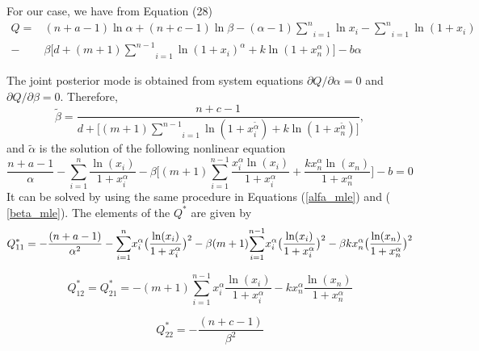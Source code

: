 \documentclass[a4paper, 11pt]{article}
\numberwithin{equation}{section}
\begin{document}
For our case, we have from Equation (28) %
\begin{equation}
\begin{aligned}
Q=&(n+a-1)\ln \alpha +(n+c-1)\ln \beta -(\alpha-1)\underset{i=1}{\overset{n}{\sum }}\ln x_{i}- \underset{i=1}{\overset{n}{\sum }}\ln (1+x_{i}) \\
-&\beta \big[ d+(m+1)\underset{i=1}{\overset{n-1}{\sum }}\ln (1+x_{i})^{\alpha} +k \ln(1+x_{n}^{\alpha}) \big]-b \alpha 
\end{aligned}
\end{equation}%

The joint posterior mode is obtained from system equations $\partial Q/\partial
\alpha =0$ and $\partial Q/\partial \beta =0$. Therefore, 
\begin{equation}
\widetilde{\beta }=\frac{n+c-1}{d+\big [(m+1)\underset{i=1}{\overset{n-1}{\sum }}\ln (1+x_{i}^{\widetilde{\alpha }}) +k \ln(1+x_n^{\widetilde{\alpha }}) \big]},
\end{equation}%
and $\widetilde{\alpha }$ is the solution of the following nonlinear equation%
\begin{equation}
\frac{n+a-1}{\alpha }-\underset{i=1}{\overset{n}{\sum }}\frac{\ln(x_i)}{1+x_i^\alpha}-\beta \big[ (m+1) \underset{i=1}{\overset{n-1}{\sum }} \frac{x_i^\alpha \ln(x_i)}{1+x_i^\alpha} 
+\frac{k x_n^\alpha \ln(x_n)}{1+x_n^\alpha} \big] -b = 0
\end{equation}%
It can be solved by using the same procedure in Equations (\ref{alfa_mle}) and (%
\ref{beta_mle}). The elements of the $Q^{\ast }$ are given by 
\begin{equation}
Q_{11}^{\ast }=-\frac{(n+a-1)}{\alpha ^{2}}-\underset{i=1}{\overset{n}{%
\sum }} x_i^\alpha \big(  \frac{\ln (x_i)}{1+x_i^\alpha }\big)^2-\beta (m+1)\underset{i=1}{\overset{n-1}{\sum }} x_i^\alpha \big( \frac{\ln (x_i)}{1+x_i^\alpha}\big )^2-
\beta k x_n^\alpha \big( \frac{\ln (x_n)}{1+x_n^\alpha} \big)^2
\label{Q11}
\end{equation}%

\begin{equation}
Q_{12}^{\ast }=Q_{21}^ {\ast}=- (m+1)\underset{i=1}{\overset{n-1}{\sum }} x_i^\alpha \frac{\ln (x_i)}{1+x_i^\alpha}- k x_n^\alpha \frac{\ln (x_n)}{1+x_n^\alpha}
\label{Q21}
\end{equation}%


\begin{equation}
Q_{22}^{\ast }=-\frac{(n+c-1)}{\beta ^{2}}
\label{Q22}
\end{equation}%
\end{document}
